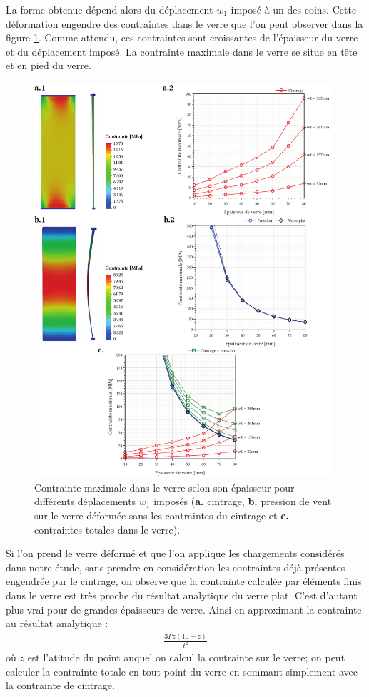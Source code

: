 \documentclass[11pt,titlepage]{article}
\begin{document}
La forme obtenue dépend alors du déplacement $w_1$ imposé à un des coins. Cette déformation engendre des contraintes dans le verre que l'on peut observer dans la figure \ref{fig:cintrage_twist}. Comme attendu, ces contraintes sont croissantes de l'épaisseur du verre et du déplacement imposé. La contrainte maximale dans le verre se situe en tête et en pied du verre.
\begin{figure}
    \centering
    \includegraphics[width=0.98\textwidth]{img/cintrage_froid/twist.pdf}
    \caption{Contrainte maximale dans le verre selon son épaisseur pour différents déplacements $w_1$ imposés (\textbf{a.} cintrage, \textbf{b.} pression de vent sur le verre déformée sans les contraintes du cintrage et \textbf{c.} contraintes totales dans le verre).}
    \label{fig:cintrage_twist}
\end{figure}
Si l'on prend le verre déformé et que l'on applique les chargements considérés dans notre étude, sans prendre en considération les contraintes déjà présentes engendrée par le cintrage, on observe que la contrainte calculée par éléments finis dans le verre est très proche du résultat analytique du verre plat. C'est d'autant plus vrai pour de grandes épaisseurs de verre. Ainsi en approximant la contrainte au résultat analytique :
\begin{align}
\frac{3P z (10 -z)}{t^2}
\end{align}
 où $z$ est l'atitude du point auquel on calcul la contrainte sur le verre; on peut calculer la contrainte totale en tout point du verre en sommant simplement avec la contrainte de cintrage. 
\end{document}
